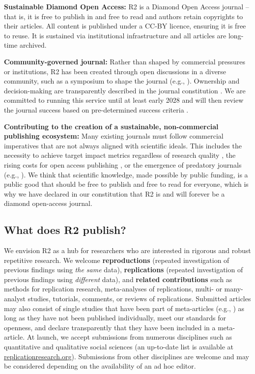 \documentclass[11pt,a4paper]{article}
\begin{document}
\textbf{Sustainable Diamond Open Access:} R2 is a Diamond Open Access
journal -- that is, it is free to publish in and free to read and
authors retain copyrights to their articles. All content is published
under a CC-BY licence, ensuring it is free to reuse. It is sustained via
institutional infrastructure and all articles are long-time archived.

\textbf{Community-governed journal:} Rather than shaped by commercial
pressures or institutions, R2 has been created through open discussions
in a diverse community, such as a symposium to shape the journal (e.g.,
\autocite{Roseler2025bR2SBook}). Ownership and decision-making are
transparently described in the journal constitution
\autocite{Roseler2025R2Constitution}. We are committed to running this
service until at least early 2028 and will then review the journal
success based on pre-determined success criteria
\autocite{Roseler2025R2DiscontinuedConditions}.

\textbf{Contributing to the creation of a sustainable, non-commercial
publishing ecosystem:} Many existing journals must follow commercial
imperatives that are not always aligned with scientific ideals. This
includes the necessity to achieve target impact metrics regardless of
research quality \autocite{brembs2018prestigious}, the rising costs for
open access publishing \autocite{Grossmann2021MarketRates}, or the
emergence of predatory journals (e.g.,
\autocite{Beall2017PredatoryPublishers}). We think that scientific
knowledge, made possible by public funding, is a public good that should
be free to publish and free to read for everyone, which is why we have
declared in our constitution that R2 is and will forever be a diamond
open-access journal.

\subsection{What does R2 publish?}\label{what-does-r2-publish}

We envision R2 as a hub for researchers who are interested in rigorous
and robust repetitive research. We welcome \textbf{reproductions}
(repeated investigation of previous findings using \emph{the same}
data), \textbf{replications} (repeated investigation of previous
findings using \emph{different} data), and \textbf{related
contributions} such as methods for replication research, meta-analyses
of replications, multi- or many-analyst studies, tutorials, comments, or
reviews of replications. Submitted articles may also consist of single
studies that have been part of meta-articles (e.g.,
\autocite{open2015estimating}) as long as they have not been published
individually, meet our standards for openness, and declare transparently
that they have been included in a meta-article. At launch, we accept
submissions from numerous disciplines such as quantitative and
qualitative social sciences (an up-to-date list is available at
\href{https://replicationresearch.org/}{replicationresearch.org}).
Submissions from other disciplines are welcome and may be considered
depending on the availability of an ad hoc editor.
\end{document}
